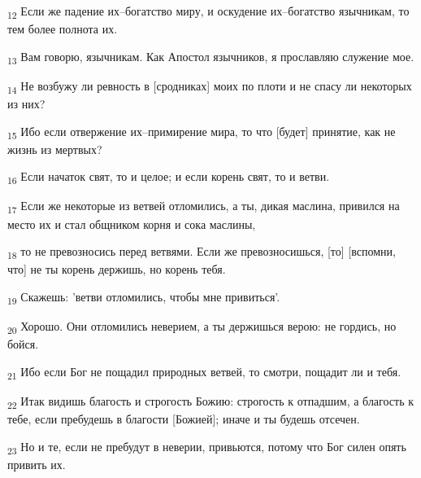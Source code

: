 \begin{tcolorbox}
\textsubscript{12} Если же падение их--богатство миру, и оскудение их--богатство язычникам, то тем более полнота их.
\end{tcolorbox}
\begin{tcolorbox}
\textsubscript{13} Вам говорю, язычникам. Как Апостол язычников, я прославляю служение мое.
\end{tcolorbox}
\begin{tcolorbox}
\textsubscript{14} Не возбужу ли ревность в [сродниках] моих по плоти и не спасу ли некоторых из них?
\end{tcolorbox}
\begin{tcolorbox}
\textsubscript{15} Ибо если отвержение их--примирение мира, то что [будет] принятие, как не жизнь из мертвых?
\end{tcolorbox}
\begin{tcolorbox}
\textsubscript{16} Если начаток свят, то и целое; и если корень свят, то и ветви.
\end{tcolorbox}
\begin{tcolorbox}
\textsubscript{17} Если же некоторые из ветвей отломились, а ты, дикая маслина, привился на место их и стал общником корня и сока маслины,
\end{tcolorbox}
\begin{tcolorbox}
\textsubscript{18} то не превозносись перед ветвями. Если же превозносишься, [то] [вспомни, что] не ты корень держишь, но корень тебя.
\end{tcolorbox}
\begin{tcolorbox}
\textsubscript{19} Скажешь: 'ветви отломились, чтобы мне привиться'.
\end{tcolorbox}
\begin{tcolorbox}
\textsubscript{20} Хорошо. Они отломились неверием, а ты держишься верою: не гордись, но бойся.
\end{tcolorbox}
\begin{tcolorbox}
\textsubscript{21} Ибо если Бог не пощадил природных ветвей, то смотри, пощадит ли и тебя.
\end{tcolorbox}
\begin{tcolorbox}
\textsubscript{22} Итак видишь благость и строгость Божию: строгость к отпадшим, а благость к тебе, если пребудешь в благости [Божией]; иначе и ты будешь отсечен.
\end{tcolorbox}
\begin{tcolorbox}
\textsubscript{23} Но и те, если не пребудут в неверии, привьются, потому что Бог силен опять привить их.
\end{tcolorbox}

